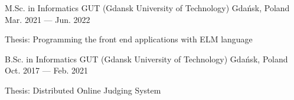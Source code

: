 
\begin{cventries}

  \cventry
    {M.Sc. in Informatics} %
    {GUT (Gdansk University of Technology)} %
    {Gdańsk, Poland} %
    {Mar. 2021 --- Jun. 2022} %
    {
      \begin{cvitems} %
        \item {Thesis: Programming the front end applications with ELM language}
      \end{cvitems}
    }

  \cventry
    {B.Sc. in Informatics} %
    {GUT (Gdansk University of Technology)} %
    {Gdańsk, Poland} %
    {Oct. 2017 --- Feb. 2021} %
    {
      \begin{cvitems} %
        \item {Thesis: Distributed Online Judging System}
      \end{cvitems}
    }

\end{cventries}
